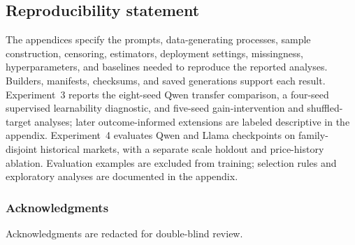\documentclass{article}
\begin{document}
\subsection*{Reproducibility statement}
The appendices specify the prompts, data-generating processes, sample construction, censoring, estimators, deployment settings, missingness, hyperparameters, and baselines needed to reproduce the reported analyses.
Builders, manifests, checksums, and saved generations support each result.
Experiment~3 reports the eight-seed Qwen transfer comparison, a four-seed supervised learnability diagnostic, and five-seed gain-intervention and shuffled-target analyses; later outcome-informed extensions are labeled descriptive in the appendix.
Experiment~4 evaluates Qwen and Llama checkpoints on family-disjoint historical markets, with a separate scale holdout and price-history ablation.
Evaluation examples are excluded from training; selection rules and exploratory analyses are documented in the appendix.

\subsubsection*{Acknowledgments}
Acknowledgments are redacted for double-blind review.

\clearpage



\clearpage

\end{document}
